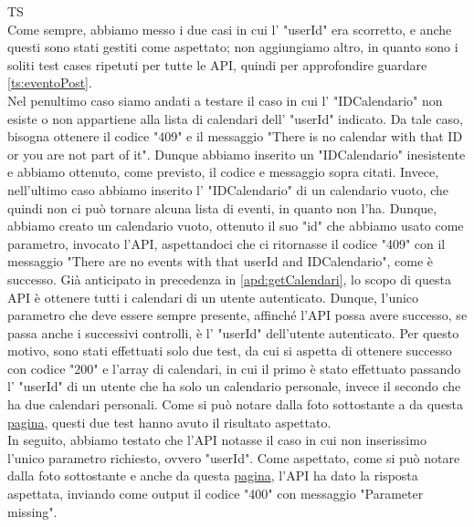 \begin{listaPersonale}{TS}
                 \\
                Come sempre, abbiamo messo i due casi in cui l' "userId" era scorretto, e anche questi sono stati gestiti come aspettato; non aggiungiamo altro, in quanto sono i soliti test cases ripetuti per tutte le API, quindi per approfondire guardare \ref{ts:eventoPost}.
                 \\
                Nel penultimo caso siamo andati a testare il caso in cui l' "IDCalendario" non esiste o  non appartiene alla lista di calendari dell' "userId" indicato. Da tale caso, bisogna ottenere il codice "409" e il messaggio "There is no calendar with that ID or you are not part of it". Dunque abbiamo inserito un "IDCalendario" inesistente e abbiamo ottenuto, come previsto, il codice e messaggio sopra citati.
                Invece, nell'ultimo caso abbiamo inserito l' "IDCalendario" di un calendario vuoto, che quindi non ci può tornare alcuna lista di eventi, in quanto non l'ha. Dunque, abbiamo creato un calendario vuoto, ottenuto il suo "id" che abbiamo usato come parametro, invocato l'API, aspettandoci che ci ritornasse il codice "409" con il messaggio "There are no events with that userId and IDCalendario", come è successo.
                Già anticipato in precedenza in \ref{apd:getCalendari}, lo scopo di questa API è ottenere tutti i calendari di un utente autenticato. Dunque, l'unico parametro che deve essere sempre presente, affinché l'API possa avere successo, se passa anche i successivi controlli, è l' "userId" dell'utente autenticato. Per questo motivo, sono stati effettuati solo due test, da cui si aspetta di ottenere successo con codice "200" e l'array di calendari, in cui il primo è stato effettuato passando l' "userId" di un utente che ha solo un calendario personale, invece il secondo che ha due calendari personali. Come si può notare dalla foto sottostante a da questa \href{https://plan-it.it/test-report.html} {pagina}, questi due test hanno avuto il risultato aspettato. \\
                In seguito, abbiamo testato che l'API notasse il caso in cui non inserissimo l'unico parametro richiesto, ovvero "userId". Come aspettato, come si può notare dalla foto sottostante e anche da questa \href{https://plan-it.it/test-report.html} {pagina}, l'API ha dato la risposta aspettata, inviando come output il codice "400" con messaggio "Parameter missing". \\

\end{listaPersonale}

